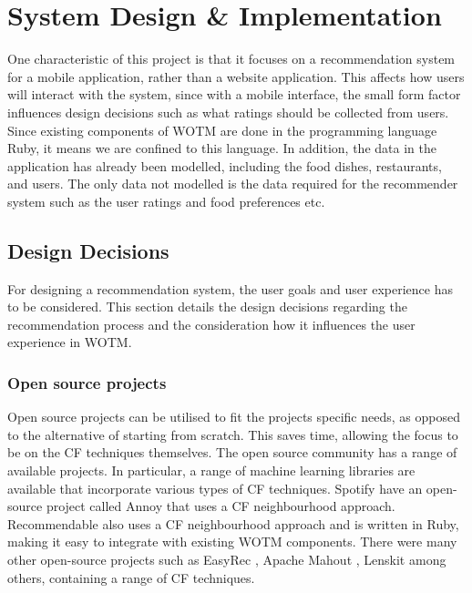 \chapter{System Design \& Implementation}\label{C:work_done}

One characteristic of this project is that it focuses on a recommendation system for a mobile application, rather than a website application. This affects how users will interact with the system, since with a mobile interface, the small form factor influences design decisions such as what ratings should be collected from users. Since existing components of WOTM are done in the programming language Ruby, it means we are confined to this language. In addition, the data in the application has already been modelled, including the food dishes, restaurants, and users. The only data not modelled is the data required for the recommender system such as the user ratings and food preferences etc.   

\section{Design Decisions}

For designing a recommendation system, the user goals and user experience has to be considered. This section details the design decisions regarding the recommendation process and the consideration how it influences the user experience in WOTM.

\subsection{Open source projects}

Open source projects can be utilised to fit the projects specific needs, as opposed to the alternative of starting from scratch. This saves time, allowing the focus to be on the CF techniques themselves. The open source community has a range of available projects. In particular, a range of machine learning libraries are available that incorporate various types of CF techniques. Spotify \cite{annoy} have an open-source project called Annoy \cite{annoy} that uses a CF neighbourhood approach. Recommendable \cite{recommendable} also uses a CF neighbourhood approach and is written in Ruby, making it easy to integrate with existing WOTM components. There were many other open-source projects such as EasyRec \cite{easyrec}, Apache Mahout \cite{mahoutaction}, Lenskit \cite{lenskit} among others, containing a range of CF techniques. 

